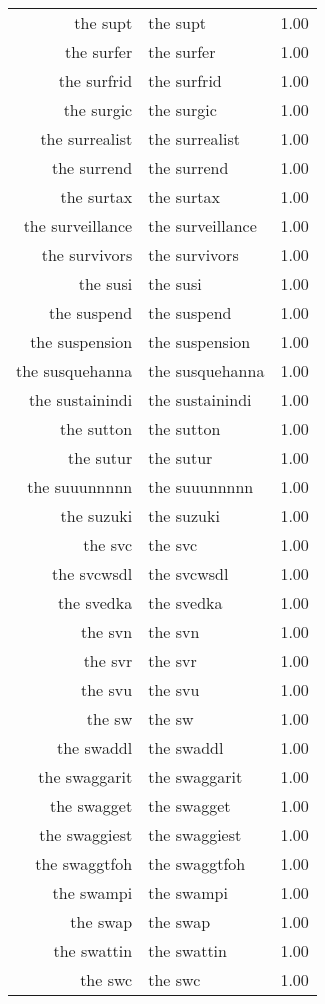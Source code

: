 \begin{table}[ht]
\begin{tabular}{rlr}
  the supt & the supt & 1.00 \\ 
  the surfer & the surfer & 1.00 \\ 
  the surfrid & the surfrid & 1.00 \\ 
  the surgic & the surgic & 1.00 \\ 
  the surrealist & the surrealist & 1.00 \\ 
  the surrend & the surrend & 1.00 \\ 
  the surtax & the surtax & 1.00 \\ 
  the surveillance & the surveillance & 1.00 \\ 
  the survivors & the survivors & 1.00 \\ 
  the susi & the susi & 1.00 \\ 
  the suspend & the suspend & 1.00 \\ 
  the suspension & the suspension & 1.00 \\ 
  the susquehanna & the susquehanna & 1.00 \\ 
  the sustainindi & the sustainindi & 1.00 \\ 
  the sutton & the sutton & 1.00 \\ 
  the sutur & the sutur & 1.00 \\ 
  the suuunnnnn & the suuunnnnn & 1.00 \\ 
  the suzuki & the suzuki & 1.00 \\ 
  the svc & the svc & 1.00 \\ 
  the svcwsdl & the svcwsdl & 1.00 \\ 
  the svedka & the svedka & 1.00 \\ 
  the svn & the svn & 1.00 \\ 
  the svr & the svr & 1.00 \\ 
  the svu & the svu & 1.00 \\ 
  the sw & the sw & 1.00 \\ 
  the swaddl & the swaddl & 1.00 \\ 
  the swaggarit & the swaggarit & 1.00 \\ 
  the swagget & the swagget & 1.00 \\ 
  the swaggiest & the swaggiest & 1.00 \\ 
  the swaggtfoh & the swaggtfoh & 1.00 \\ 
  the swampi & the swampi & 1.00 \\ 
  the swap & the swap & 1.00 \\ 
  the swattin & the swattin & 1.00 \\ 
  the swc & the swc & 1.00 \\ 

\end{tabular}
\end{table}

